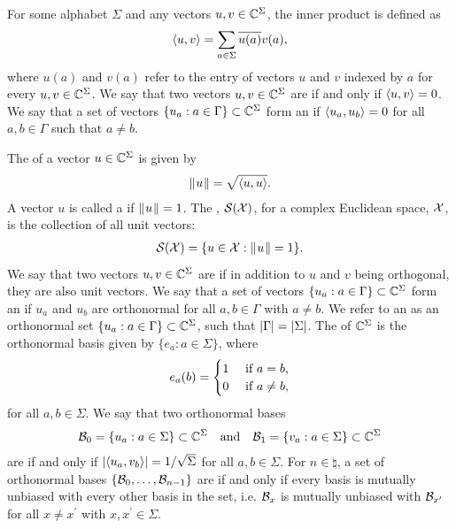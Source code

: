 For some alphabet $\Sigma$ and any vectors $u,v \in \mathbb{C}^{\Sigma}$, the inner product is defined as 
\begin{align}
	\langle u , v\rangle = \sum_{a \in \Sigma} \overline{u(a)}v(a),
\end{align}
where $u(a)$ and $v(a)$ refer to the entry of vectors $u$ and $v$ indexed by $a$ for every $u,v \in \mathbb{C}^{\Sigma}$. We say that two vectors $u,v \in \mathbb{C}^{\Sigma}$ are  if and only if $\langle u , v\rangle = 0$. We say that a set of vectors $\{u_a : a \in \Gamma \} \subset \mathbb{C}^{\Sigma}$ form an  if $\langle u_a , u_b\rangle = 0$ for all $a,b \in \Gamma$ such that $a \not= b$. 

The  of a vector $u \in \mathbb{C}^{\Sigma}$ is given by 
\begin{align}
	\lVert\mspace{1mu} u \mspace{1mu}\rVert = \sqrt{\langle u , u\rangle}.
\end{align}
A vector $u$ is called a  if $\lVert\mspace{1mu} u \mspace{1mu}\rVert = 1$. The , $\mathcal{S}(\mathcal{X})$, for a complex Euclidean space, $\mathcal{X}$, is the collection of all unit vectors:
\begin{align}
	\mathcal{S}(\mathcal{X}) = \{u \in \mathcal{X} : \lVert\mspace{1mu} u \mspace{1mu}\rVert = 1\}.
\end{align}
We say that two vectors $u,v \in \mathbb{C}^{\Sigma}$ are  if in addition to $u$ and $v$ being orthogonal, they are also unit vectors. We say that a set of vectors $\{u_a : a \in \Gamma \} \subset \mathbb{C}^{\Sigma}$ form an  if $u_a$ and $u_b$ are orthonormal for all $a,b \in \Gamma$ with $a \not= b$. We refer to an  as an orthonormal set $\{u_a : a \in \Gamma \} \subset \mathbb{C}^{\Sigma}$, such that $\left\lvert \Gamma \right\rvert = \left\lvert \Sigma \right\rvert$. The  of $\mathbb{C}^{\Sigma}$ is the orthonormal basis given by $\{ e_a : a \in \Sigma \}$, where 
\[
e_{a}(b) =
  \begin{cases} 
      \hfill 1 \hfill & \text{ if $a=b$}, \\
      \hfill 0 \hfill & \text{ if $a \not= b$}, \\
  \end{cases}
\]
for all $a,b \in \Sigma$. We say that two orthonormal bases 
\begin{align}
	\mathcal{B}_0 = \{u_a : a \in \Sigma \} \subset \mathbb{C}^{\Sigma} \quad \textnormal{and} \quad \mathcal{B}_1 = \{ v_a : a \in \Sigma \} \subset \mathbb{C}^{\Sigma}
\end{align}
are  if and only if $\left\lvert \langle u_a , v_b\rangle \right\rvert = 1/\sqrt{\Sigma}$ for all $a,b \in \Sigma$. For $n \in \natural$, a set of orthonormal bases $\{ \mathcal{B}_0, \ldots, \mathcal{B}_{n-1} \}$ are  if and only if every basis is mutually unbiased with every other basis in the set, i.e. $\mathcal{B}_x$ is mutually unbiased with $\mathcal{B}_{x^{\prime}}$ for all $x \not= x^{\prime}$ with $x,x^{\prime} \in \Sigma$. 

